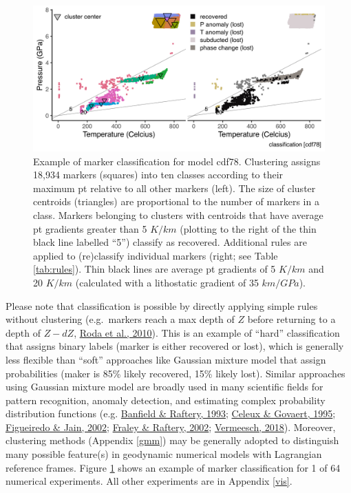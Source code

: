 \begin{figure}[htbp]

{\centering \includegraphics[width=1\linewidth,]{assets/figs/chpt4/k10/cdf78_class} 

}

\caption[Example of marker classification for model cdf78]{Example of marker classification for model cdf78. Clustering assigns 18,934 markers (squares) into ten classes according to their maximum \gls{pt} relative to all other markers (left). The size of cluster centroids (triangles) are proportional to the number of markers in a class. Markers belonging to clusters with centroids that have average \gls{pt} gradients greater than 5 \(K/km\) (plotting to the right of the thin black line labelled ``5'') classify as recovered. Additional rules are applied to (re)classify individual markers (right; see Table \ref{tab:rules}). Thin black lines are average \gls{pt} gradients of 5 \(K/km\) and 20 \(K/km\) (calculated with a lithostatic gradient of 35 \(km/GPa\)).}\label{fig:class}
\end{figure}

Please note that classification is possible by directly applying simple rules without clustering (e.g.~markers reach a max depth of \(Z\) before returning to a depth of \(Z-dZ\), \protect\hyperlink{ref-roda2010}{Roda et al., 2010}). This is an example of ``hard'' classification that assigns binary labels (marker is either recovered or lost), which is generally less flexible than ``soft'' approaches like Gaussian mixture model that assign probabilities (maker is 85\% likely recovered, 15\% likely lost). Similar approaches using Gaussian mixture model are broadly used in many scientific fields for pattern recognition, anomaly detection, and estimating complex probability distribution functions (e.g. \protect\hyperlink{ref-banfield1993}{Banfield \& Raftery, 1993}; \protect\hyperlink{ref-celeux1995}{Celeux \& Govaert, 1995}; \protect\hyperlink{ref-figueiredo2002}{Figueiredo \& Jain, 2002}; \protect\hyperlink{ref-fraley2002}{Fraley \& Raftery, 2002}; \protect\hyperlink{ref-vermeesch2018}{Vermeesch, 2018}). Moreover, clustering methods (Appendix \ref{gmm}) may be generally adopted to distinguish many possible feature(s) in geodynamic numerical models with Lagrangian reference frames. Figure \ref{fig:class} shows an example of marker classification for 1 of 64 numerical experiments. All other experiments are in Appendix \ref{vis}.

